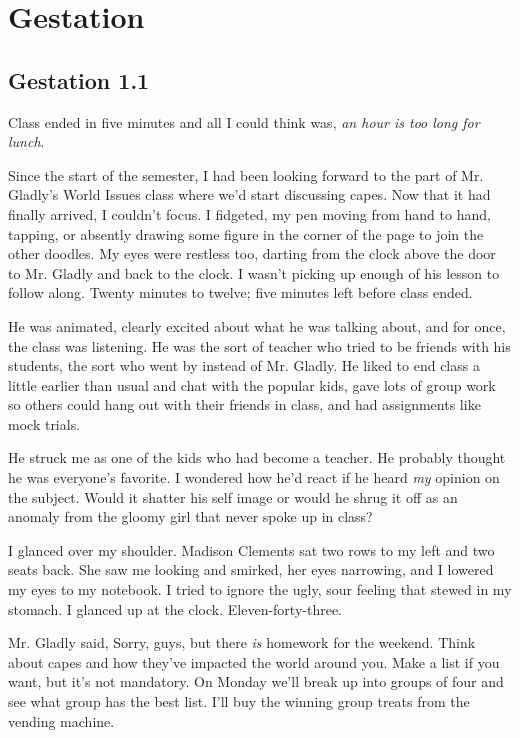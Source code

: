 \part{Gestation}

\chapter{Gestation 1.1}

Class ended in five minutes and all I could think was, {\em an hour is too long for lunch}.

Since the start of the semester, I had been looking forward to the part of Mr. Gladly's World Issues class where we'd start discussing capes. Now that it had finally arrived, I couldn't focus. I fidgeted, my pen moving from hand to hand, tapping, or absently drawing some figure in the corner of the page to join the other doodles. My eyes were restless too, darting from the clock above the door to Mr. Gladly and back to the clock. I wasn't picking up enough of his lesson to follow along. Twenty minutes to twelve; five minutes left before class ended.

He was animated, clearly excited about what he was talking about, and for once, the class was listening. He was the sort of teacher who tried to be friends with his students, the sort who went by  instead of Mr. Gladly. He liked to end class a little earlier than usual and chat with the popular kids, gave lots of group work so others could hang out with their friends in class, and had  assignments like mock trials.

He struck me as one of the  kids who had become a teacher. He probably thought he was everyone's favorite. I wondered how he'd react if he heard {\em my} opinion on the subject. Would it shatter his self image or would he shrug it off as an anomaly from the gloomy girl that never spoke up in class?

I glanced over my shoulder. Madison Clements sat two rows to my left and two seats back. She saw me looking and smirked, her eyes narrowing, and I lowered my eyes to my notebook. I tried to ignore the ugly, sour feeling that stewed in my stomach. I glanced up at the clock. Eleven-forty-three.

 Mr. Gladly said, Sorry, guys, but there {\em is} homework for the weekend. Think about capes and how they've impacted the world around you. Make a list if you want, but it's not mandatory. On Monday we'll break up into groups of four and see what group has the best list. I'll buy the winning group treats from the vending machine.

